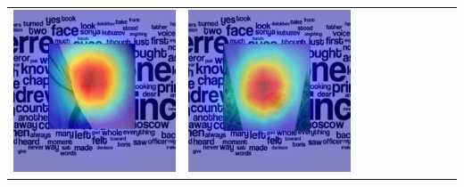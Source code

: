 \begin{landscape}
\begin{table}[]
\begin{tabular}{@{}c c c c c c c c c c@{}}
			\includegraphics[width=.12\textheight ,keepaspectratio]{images/pretraining/gradcam/3/EfficientNetB4CombinedGradCam.png} &
			\includegraphics[width=.12\textheight ,keepaspectratio]{images/pretraining/gradcam/9/EfficientNetB4CombinedGradCam.png} &

\end{tabular}
\end{table}
\end{landscape}
